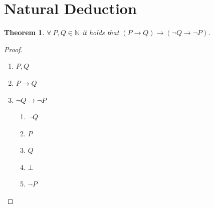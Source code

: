 \documentclass[a4paper]{article}
\newtheorem{theorem}{Theorem}
\begin{document}

\setlength{\parindent}{0pt}
\setlength{\parskip}{0.8em}


%
%
%
%
%
%

\section{Natural Deduction}

\begin{theorem}\label{theorem:contrapositive}
  \(\forall \ P, Q \in \mathbb{N}\) it holds that \((P \rightarrow Q) \rightarrow (\neg Q \rightarrow \neg P)\).
\end{theorem}


\begin{proof} \hfill

\begin{enumerate}
  \item \(P, Q\) \hfill {}
  \item \(P \rightarrow Q\) \hfill {}
  \item \(\neg Q \rightarrow \neg P\) \hfill {}
  \begin{enumerate}
    \item \(\neg Q\) \hfill {}
    \item \(P\) \hfill {}
    \item \(Q\) \hfill {}
    \item \(\bot\) \hfill {}
    \item \(\neg P\) \hfill {}
  \end{enumerate}
\end{enumerate}

\end{proof}
\end{document}
